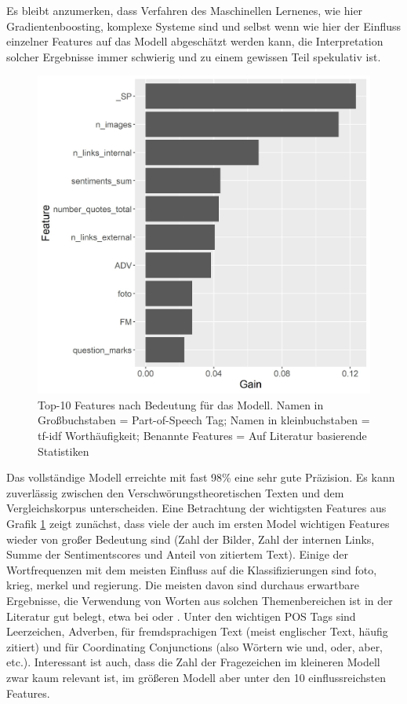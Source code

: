 Es bleibt anzumerken, dass Verfahren des Maschinellen Lernenes, wie hier Gradientenboosting, komplexe Systeme sind und selbst wenn wie hier der Einfluss einzelner Features auf das Modell abgeschätzt werden kann, die Interpretation solcher Ergebnisse immer schwierig und zu einem gewissen Teil spekulativ ist.

\begin{figure}[h]
    \centering
    \includegraphics[scale=0.45]{graphics/top_10_features.jpg}
    \caption{Top-10 Features nach Bedeutung für das Modell. Namen in Großbuchstaben = Part-of-Speech Tag; Namen in kleinbuchstaben = tf-idf Worthäufigkeit; Benannte Features = Auf Literatur basierende Statistiken}
    \label{top-features}
\end{figure}

\FloatBarrier

Das vollständige Modell erreichte mit fast 98\% eine sehr gute Präzision.
Es kann zuverlässig zwischen den Verschwörungstheoretischen Texten und dem Vergleichskorpus unterscheiden.
Eine Betrachtung der wichtigsten Features aus Grafik \ref{top-features} zeigt zunächst, dass viele der auch im ersten Model wichtigen Features wieder von großer Bedeutung sind (Zahl der Bilder, Zahl der internen Links, Summe der Sentimentscores und Anteil von zitiertem Text).
Einige der Wortfrequenzen mit dem meisten Einfluss auf die Klassifizierungen sind foto, krieg, merkel und regierung.
Die meisten davon sind durchaus erwartbare Ergebnisse, die Verwendung von Worten aus solchen Themenbereichen ist in der Literatur gut belegt, etwa bei \textcite[150]{stumpf_2019} oder \textcite[25]{uscinski_2014}.
Unter den wichtigen POS Tags sind Leerzeichen, Adverben, für fremdsprachigen Text (meist englischer Text, häufig zitiert) und für Coordinating Conjunctions (also Wörtern wie und, oder, aber, etc.\parencite*[vgl.][]{smith_2003}).
Interessant ist auch, dass die Zahl der Fragezeichen im kleineren Modell zwar kaum relevant ist, im größeren Modell aber unter den 10 einflussreichsten Features.


